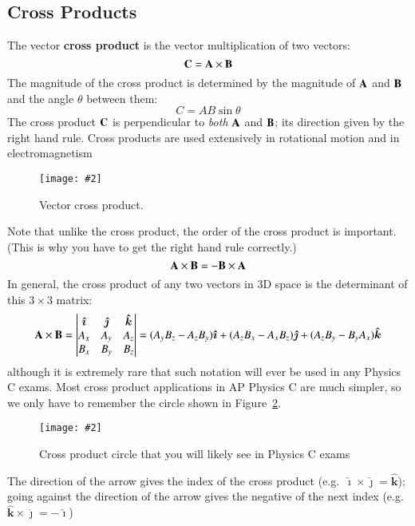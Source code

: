 \documentclass[11pt]{article}
\newcommand{\pic}[2]{\texttt{[image: \#2]}}
\newcommand{\mb}[1]{\ensuremath\mathbf{#1}}
\begin{document}
\subsection{Cross Products}
The vector \textbf{cross product} is the vector multiplication of two vectors:
\begin{equation*}
  \mb{C}=\mb{A}\times\mb{B}
\end{equation*}
The magnitude of the cross product is determined by the magnitude of $\mb{A}$
and $\mb{B}$ and the angle $\theta$ between them:
\begin{equation*}
  C=AB\sin\theta
\end{equation*}
The cross product $\mb{C}$ is perpendicular to \emph{both} $\mb{A}$ and
$\mb{B}$; its direction given by the right hand rule. Cross products are used
extensively in rotational motion and in electromagnetism
\begin{figure}[ht]
  \centering
  \pic{.3}{cross-product.png}
  \caption{Vector cross product.}
  \label{fig:cross1}
\end{figure}
Note that unlike the cross product, the order of the cross product is
important. (This is why you have to get the right hand rule correctly.)
\begin{equation*}
  \mb{A}\times\mb{B}=-\mb{B}\times\mb{A}
\end{equation*}
In general, the cross product of any two vectors in 3D space is the determinant
of this $3\times 3$ matrix:
\begin{equation*}
  \mb{A}\times\mb{B}=
  \left|
  \begin{matrix}
    \bm{\hat{\imath}} & \bm{\hat{\jmath}} & \bm{\hat{k}}\\
    A_x & A_y & A_z\\
    B_x & B_y & B_z
  \end{matrix}
  \right|
  =(A_yB_z-A_zB_y)\bm{\hat{\imath}} +
  (A_zB_x-A_xB_z)\bm{\hat{\jmath}} +
  (A_zB_y-B_yA_x)\bm{\hat{k}}
\end{equation*}
although it is extremely rare that such notation will ever be used in any
Physics C exams. Most cross product applications in AP Physics C are much
simpler, so we only have to remember the circle shown in
Figure~\ref{fig:cross2}.
\begin{figure}[ht]
  \centering
  \pic{.12}{cross-product-circle.png}
  \caption{Cross product circle that you will likely see in Physics C exams}
  \label{fig:cross2}
\end{figure}

The direction of the arrow gives the index of the cross product (e.g.\
$\bm{\hat{\imath}}\times\bm{\hat{\jmath}}=\bm{\hat{k}}$); going against the
direction of the arrow gives the negative of the next index (e.g.\
$\bm{\hat{k}}\times\bm{\hat{\jmath}}=-\bm{\hat{\imath}}$)
\end{document}
